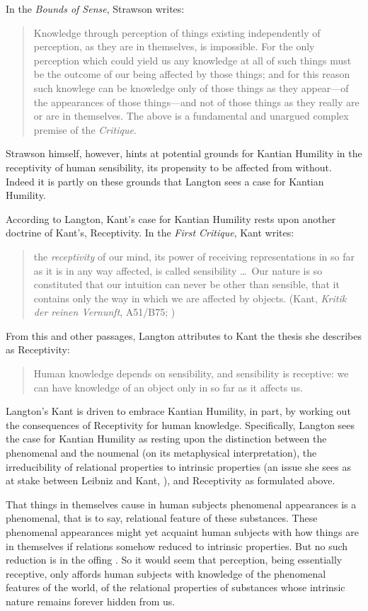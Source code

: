 In the \emph{Bounds of Sense}, Strawson writes:
\begin{quote}
	Knowledge through perception of things existing independently of perception, as they are in themselves, is impossible. For the only perception which could yield us any knowledge at all of such things must be the outcome of our being affected by those things; and for this reason such knowlege can be knowledge only of those things as they appear---of the appearances of those things---and not of those things as they really are or are in themselves. The above is a fundamental and unargued complex premise of the \emph{Critique}. \citep[250]{Strawson:1966kx}
\end{quote}
Strawson himself, however, hints at potential grounds for Kantian Humility in the receptivity of human sensibility, its propensity to be affected from without. Indeed it is partly on these grounds that Langton sees a case for Kantian Humility.

According to Langton, Kant's case for Kantian Humility rests upon another doctrine of Kant's, Receptivity. In the \emph{First Critique}, Kant writes:
\begin{quote}
	the \emph{receptivity} of our mind, its power of receiving representations in so far as it is in any way affected, is called sensibility \ldots\ Our nature is so constituted that our intuition can never be other than sensible, that it contains only the way in which we are affected by objects. (Kant, \emph{Kritik der reinen Vernunft}, A51/B75; \citealt[93]{Smith:1965jw})
\end{quote}
From this and other passages, Langton attributes to Kant the thesis she describes as Receptivity:
\begin{quote}
	Human knowledge depends on sensibility, and sensibility is receptive: we can have knowledge of an object only in so far as it affects us. \citep[125]{Langton:1998aa}
\end{quote}
Langton's Kant is driven to embrace Kantian Humility, in part, by working out the consequences of Receptivity for human knowledge. Specifically, Langton sees the case for Kantian Humility as resting upon the distinction between the phenomenal and the noumenal (on its metaphysical interpretation), the irreducibility of relational properties to intrinsic properties (an issue she sees as at stake between Leibniz and Kant, \citealt[chapters 4 and 5]{Langton:1998aa}), and Receptivity as formulated above. 

That things in themselves cause in human subjects phenomenal appearances is a phenomenal, that is to say, relational feature of these substances. These phenomenal appearances might yet acquaint human subjects with how things are in themselves if relations somehow reduced to intrinsic properties. But no such reduction is in the offing \citep[chapter 5]{Langton:1998aa}. So it would seem that perception, being essentially receptive, only affords human subjects with knowledge of the phenomenal features of the world, of the relational properties of substances whose intrinsic nature remains forever hidden from us.

